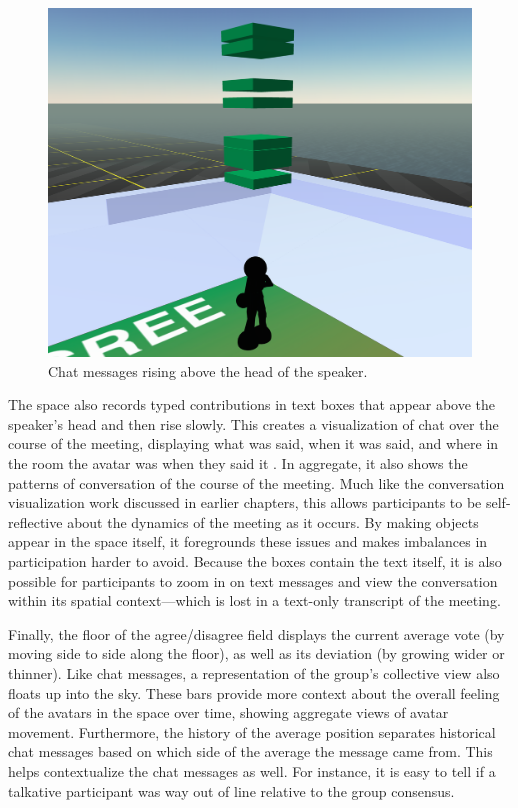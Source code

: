 \begin{figure}[tp]
	\includegraphics{figures/chat-history-lower.png}
	\caption{Chat messages rising above the head of the speaker.}
	\label{fig:information_space_chat}
\end{figure}

The space also records typed contributions in text boxes that appear above the speaker's head and then rise slowly. This creates a visualization of chat over the course of the meeting, displaying what was said, when it was said, and where in the room the avatar was when they said it \citep{DiMicco:2007ie}. In aggregate, it also shows the patterns of conversation of the course of the meeting. Much like the conversation visualization work discussed in earlier chapters, this allows participants to be self-reflective about the dynamics of the meeting as it occurs. By making objects appear in the space itself, it foregrounds these issues and makes imbalances in participation harder to avoid. Because the boxes contain the text itself, it is also possible for participants to zoom in on text messages and view the conversation within its spatial context---which is lost in a text-only transcript of the meeting.

Finally, the floor of the agree/disagree field displays the current average vote (by moving side to side along the floor), as well as its deviation (by growing wider or thinner). Like chat messages, a representation of the group's collective view also floats up into the sky. These bars provide more context about the overall feeling of the avatars in the space over time, showing aggregate views of avatar movement. Furthermore, the history of the average position separates historical chat messages based on which side of the average the message came from. This helps contextualize the chat messages as well. For instance, it is easy to tell if a talkative participant was way out of line relative to the group consensus.

